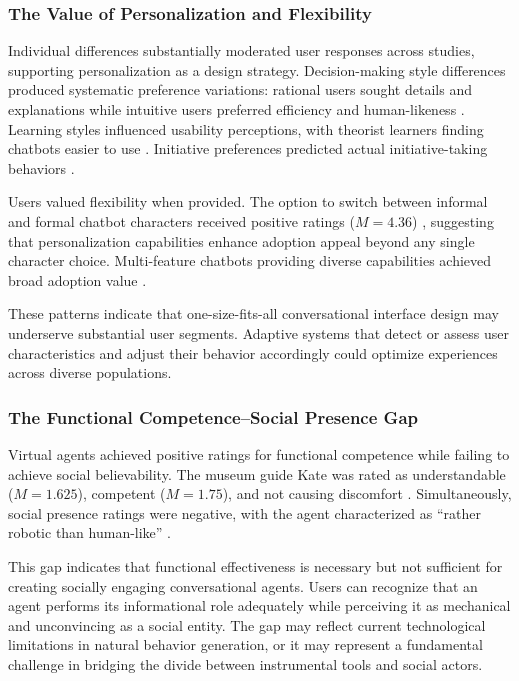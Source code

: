 \documentclass[manuscript,anonymous,sigconf]{acmart}
\begin{document}
\subsubsection{The Value of Personalization and Flexibility}

Individual differences substantially moderated user responses across studies, supporting personalization as a design strategy. Decision-making style differences produced systematic preference variations: rational users sought details and explanations while intuitive users preferred efficiency and human-likeness \cite{A42}. Learning styles influenced usability perceptions, with theorist learners finding chatbots easier to use \cite{A54}. Initiative preferences predicted actual initiative-taking behaviors \cite{A42}.

Users valued flexibility when provided. The option to switch between informal and formal chatbot characters received positive ratings ($M = 4.36$) \cite{A79}, suggesting that personalization capabilities enhance adoption appeal beyond any single character choice. Multi-feature chatbots providing diverse capabilities achieved broad adoption value \cite{A79}.

These patterns indicate that one-size-fits-all conversational interface design may underserve substantial user segments. Adaptive systems that detect or assess user characteristics and adjust their behavior accordingly could optimize experiences across diverse populations.

\subsubsection{The Functional Competence--Social Presence Gap}

Virtual agents achieved positive ratings for functional competence while failing to achieve social believability. The museum guide Kate was rated as understandable ($M = 1.625$), competent ($M = 1.75$), and not causing discomfort \cite{A82}. Simultaneously, social presence ratings were negative, with the agent characterized as ``rather robotic than human-like'' \cite{A82}.

This gap indicates that functional effectiveness is necessary but not sufficient for creating socially engaging conversational agents. Users can recognize that an agent performs its informational role adequately while perceiving it as mechanical and unconvincing as a social entity. The gap may reflect current technological limitations in natural behavior generation, or it may represent a fundamental challenge in bridging the divide between instrumental tools and social actors.
\end{document}
